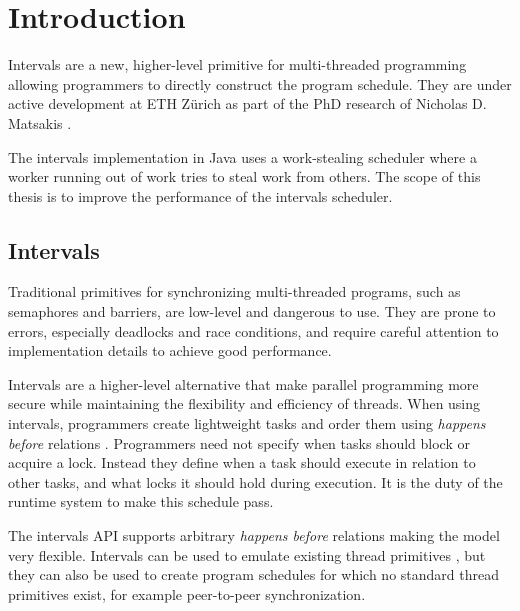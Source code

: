 
\chapter{Introduction}
\label{chap:introduction}

Intervals \cite{Matsakis2009a} are a new, higher-level primitive for
multi-threaded programming allowing programmers to directly construct
the program schedule. They are under active development at ETH Zürich
as part of the PhD research of Nicholas D. Matsakis
\cite{Matsakis2010}.

The intervals implementation in Java uses a work-stealing scheduler
where a worker running out of work tries to steal work from
others. The scope of this thesis is to improve the performance of the
intervals scheduler.


\section{Intervals}
\label{sec:intro-intervals}

Traditional primitives for synchronizing multi-threaded programs, such
as semaphores and barriers, are low-level and dangerous to use. They
are prone to errors, especially deadlocks and race conditions, and
require careful attention to implementation details to achieve good
performance.


Intervals are a higher-level alternative that make parallel
programming more secure while maintaining the flexibility and
efficiency of threads. When using intervals, programmers create
lightweight tasks and order them using \emph{happens before} relations
\cite{Lamport1978}. Programmers need not specify when tasks should
block or acquire a lock. Instead they define when a task should
execute in relation to other tasks, and what locks it should hold
during execution. It is the duty of the runtime system to make this
schedule pass.

The intervals API supports arbitrary \emph{happens before} relations
making the model very flexible. Intervals can be used to emulate
existing thread primitives \cite{Matsakis2009a}, but they can also be
used to create program schedules for which no standard thread
primitives exist, for example peer-to-peer synchronization.

